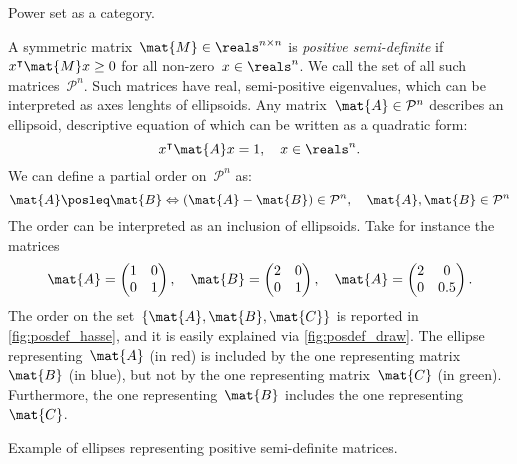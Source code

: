  \begin{marginfigure}
      \begin{center}
      \end{center}
      \caption{Power set as a category.}
      \label{fig:powersetcat}
  \end{marginfigure}

\begin{example}
A symmetric matrix~$\mat{M}\in \reals^{n\times n}$ is \emph{positive semi-definite} if~$x^\intercal \mat{M}x\geq 0$ for all non-zero~$x\in \reals^n$.
We call the set of all such matrices~$\mathcal{P}^n$. Such matrices have real, semi-positive eigenvalues, which can be interpreted as axes lenghts of ellipsoids.
Any matrix~$\mat{A}\in \mathcal{P}^n$ describes an ellipsoid, descriptive equation of which can be written as a quadratic form:
\begin{equation*}
    x^\intercal \mat{A}x=1,\quad x\in \reals^n.
\end{equation*}
We can define a partial order on~$\mathcal{P}^n$ as:
\begin{equation*}
\mat{A}\posleq \mat{B} \Leftrightarrow (\mat{A}-\mat{B})\in \mathcal{P}^n, \quad \mat{A},\mat{B}\in \mathcal{P}^n
\end{equation*}
The order can be interpreted as an inclusion of ellipsoids. Take for instance the matrices
\begin{equation*}
    \mat{A}=\begin{pmatrix}1&0\\0&1\end{pmatrix}, \quad \mat{B}=\begin{pmatrix}2&0\\0&1\end{pmatrix},\quad \mat{A}=\begin{pmatrix}2&0\\0&0.5\end{pmatrix}.
\end{equation*}
The order on the set~$\{\mat{A},\mat{B},\mat{C}\}$ is reported in \cref{fig:posdef_hasse}, and it is easily explained via \cref{fig:posdef_draw}.
The ellipse representing~$\mat{A}$ (in red) is included by the one representing matrix~$\mat{B}$ (in blue), but not by the one representing matrix~$\mat{C}$ (in green).
Furthermore, the one representing~$\mat{B}$ includes the one representing~$\mat{C}$.
\end{example}

\begin{marginfigure}
    \begin{center}
    \end{center}
    \caption{Example of ellipses representing positive semi-definite matrices.}
    \label{fig:posdef_draw}
\end{marginfigure}

